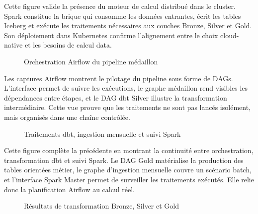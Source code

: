 Cette figure valide la présence du moteur de calcul distribué dans le cluster. Spark constitue la brique qui consomme les données entrantes, écrit les tables Iceberg et exécute les traitements nécessaires aux couches Bronze, Silver et Gold. Son déploiement dans Kubernetes confirme l'alignement entre le choix cloud-native et les besoins de calcul data.

\begin{figure}[H]
\centering
{}
\caption{Orchestration Airflow du pipeline médaillon}
\label{fig:realisation-airflow-medallion}
\end{figure}

Les captures Airflow montrent le pilotage du pipeline sous forme de DAGs. L'interface permet de suivre les exécutions, le graphe médaillon rend visibles les dépendances entre étapes, et le DAG dbt Silver illustre la transformation intermédiaire. Cette vue prouve que les traitements ne sont pas lancés isolément, mais organisés dans une chaîne contrôlée.

\begin{figure}[H]
\centering
{}
\caption{Traitements dbt, ingestion mensuelle et suivi Spark}
\label{fig:realisation-airflow-spark}
\end{figure}

Cette figure complète la précédente en montrant la continuité entre orchestration, transformation dbt et suivi Spark. Le DAG Gold matérialise la production des tables orientées métier, le graphe d'ingestion mensuelle couvre un scénario batch, et l'interface Spark Master permet de surveiller les traitements exécutés. Elle relie donc la planification Airflow au calcul réel.

\begin{figure}[H]
\centering
{}
\caption{Résultats de transformation Bronze, Silver et Gold}
\label{fig:realisation-tables-medallion}
\end{figure}

